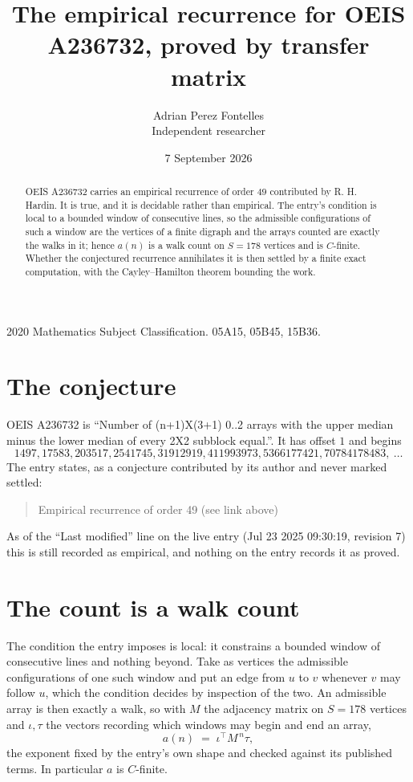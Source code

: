 \documentclass[11pt,a4paper]{article}
\title{The empirical recurrence for OEIS A236732, proved by transfer matrix}
\author{Adrian Perez Fontelles\\ \small Independent researcher}
\date{7 September 2026}
\theoremstyle{plain}
\theoremstyle{definition}
\begin{document}
\maketitle

\begin{abstract}
OEIS A236732 carries an empirical recurrence of order $49$ contributed by R. H. Hardin. It is
true, and it is decidable rather than empirical. The entry's condition is local to a bounded window of consecutive lines, so
the admissible configurations of such a window are the vertices of a finite digraph and the
arrays counted are exactly the walks in it; hence $a(n)$ is a walk count on $S=178$ vertices
and is $C$-finite. Whether the conjectured recurrence annihilates it is then settled by a
finite exact computation, with the Cayley--Hamilton theorem bounding the work.
\end{abstract}

\noindent\small 2020 Mathematics Subject Classification. 05A15, 05B45, 15B36.\normalsize

\section{The conjecture}

OEIS A236732 is ``Number of (n+1)X(3+1) 0..2 arrays with the upper median minus the lower median of every 2X2 subblock equal.''. It has offset $1$ and begins
\[
1497, 17583, 203517, 2541745, 31912919, 411993973, 5366177421, 70784178483,\ \dots
\]
The entry states, as a conjecture contributed by its author and never marked settled:
\begin{quote}
Empirical recurrence of order 49 (see link above)
\end{quote}
As of the ``Last modified'' line on the live entry (Jul 23 2025 09:30:19, revision 7) this is still
recorded as empirical, and nothing on the entry records it as proved.

\section{The count is a walk count}

The condition the entry imposes is local: it constrains a bounded window of consecutive lines and nothing beyond. Take as
vertices the admissible configurations of one such window and put an edge from $u$ to $v$
whenever $v$ may follow $u$, which the condition decides by inspection of the two. An
admissible array is then exactly a walk, so with $M$ the adjacency matrix on $S=178$ vertices
and $\iota,\tau$ the vectors recording which windows may begin and end an array,
\[
a(n)\;=\;\iota^{\!\top}M^{\,n}\tau ,
\]
the exponent fixed by the entry's own shape and checked against its published terms. In
particular $a$ is $C$-finite.
\end{document}
